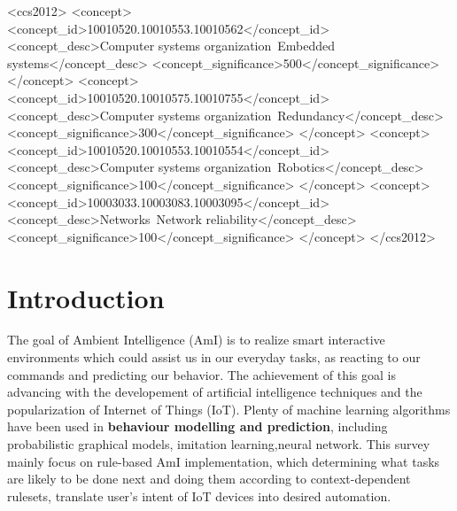 \documentclass[sigplan, screen]{acmart}
\begin{document}
\begin{CCSXML}
<ccs2012>
 <concept>
  <concept_id>10010520.10010553.10010562</concept_id>
  <concept_desc>Computer systems organization~Embedded systems</concept_desc>
  <concept_significance>500</concept_significance>
 </concept>
 <concept>
  <concept_id>10010520.10010575.10010755</concept_id>
  <concept_desc>Computer systems organization~Redundancy</concept_desc>
  <concept_significance>300</concept_significance>
 </concept>
 <concept>
  <concept_id>10010520.10010553.10010554</concept_id>
  <concept_desc>Computer systems organization~Robotics</concept_desc>
  <concept_significance>100</concept_significance>
 </concept>
 <concept>
  <concept_id>10003033.10003083.10003095</concept_id>
  <concept_desc>Networks~Network reliability</concept_desc>
  <concept_significance>100</concept_significance>
 </concept>
</ccs2012>
\end{CCSXML}



\maketitle
\section{Introduction}
The goal of Ambient Intelligence (AmI) is to realize smart interactive environments which could assist us in our everyday 
tasks, as reacting to our commands and predicting our behavior. The achievement of this goal is advancing with the developement
of artificial intelligence techniques and the popularization of Internet of Things (IoT). Plenty of machine learning algorithms
have been used in \textbf{behaviour modelling and prediction}, including probabilistic graphical models\cite{mohmed2020enhanced, nazerfard2012bayesian, wu2016behavior},
imitation learning\cite{minor2015data, minor2017learning},neural network\cite{tax2018human, xu2016user}. This survey mainly focus 
on rule-based AmI implementation\cite{pentland1999modeling, jakkula2007mining}, which determining what tasks are likely to be done next and doing them
according to context-dependent rulesets, translate user’s intent of IoT devices into desired automation.
\end{document}
